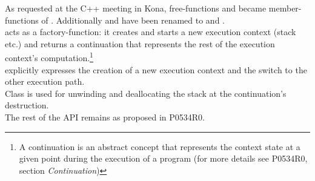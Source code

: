 
As requested at the C++ meeting in Kona, free-functions \getdata and \dataavail
became member-functions of \cont. Additionally  and
 have been renamed to \resume and
\resumewith.\\
\newline
\callcc acts as a factory-function: it creates and starts a new execution context
(stack etc.) and returns a continuation that represents the rest of the execution
context's computation.\footnote{A continuation is an abstract concept that
represents the context state at a given point during the execution of a program
(for more details see P0534R0, section \emph{Continuation}\cite{P0534R0})}\\
\callcc explicitly expresses the creation of a new execution
context and the switch to the other execution path.\\
\newline
Class  is used for unwinding and deallocating the stack
at the continuation's destruction.\\
\newline
The rest of the API remains as proposed in P0534R0\cite{P0534R0}.
